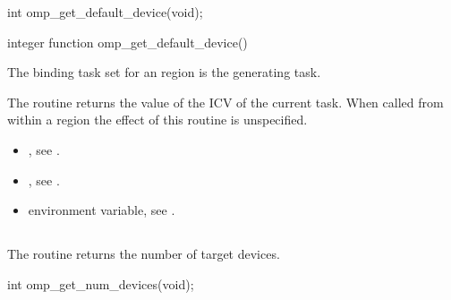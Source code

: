 \format
\begin{ccppspecific}
\begin{ompcFunction}
int omp_get_default_device(void);
\end{ompcFunction}
\end{ccppspecific}

\begin{fortranspecific}
\begin{ompfFunction}
integer function omp_get_default_device()
\end{ompfFunction}
\end{fortranspecific}

\binding
The binding task set for an  region is the generating
task.

\effect
The  routine returns the value of the 
ICV of the current task. When called from within a  region the effect of this
routine is unspecified.

\crossreferences
\begin{itemize}
\item {}, see
.

\item {}, see
.

\item {} environment variable, see
.
\end{itemize}











\subsection{}
\label{subsec:omp_get_num_devices}
\summary
The  routine returns the number of target devices.

\format
\begin{ccppspecific}
\begin{ompcFunction}
int omp_get_num_devices(void);
\end{ompcFunction}
\end{ccppspecific}

